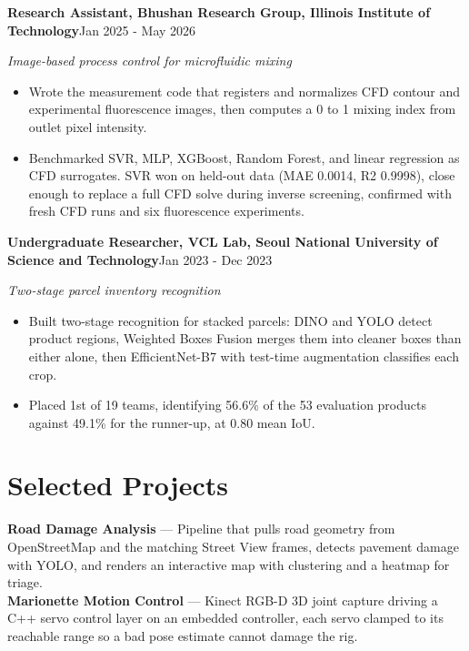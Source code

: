 \documentclass[letterpaper,10pt]{extarticle}
\newcommand{\role}[3]{%
  \textbf{#1}\hfill #3\par
  {\small\itshape #2}\par\vspace{0.5pt}
}
\begin{document}
\role{Research Assistant, Bhushan Research Group, Illinois Institute of Technology}{Image-based process control for microfluidic mixing}{Jan 2025 - May 2026}
\begin{itemize}
  \item Wrote the measurement code that registers and normalizes CFD contour and experimental
        fluorescence images, then computes a 0 to 1 mixing index from outlet pixel intensity.
  \item Benchmarked SVR, MLP, XGBoost, Random Forest, and linear regression as CFD surrogates. SVR
        won on held-out data (MAE 0.0014, R2 0.9998), close enough to replace a full CFD solve during
        inverse screening, confirmed with fresh CFD runs and six fluorescence experiments.
\end{itemize}

\role{Undergraduate Researcher, VCL Lab, Seoul National University of Science and Technology}{Two-stage parcel inventory recognition}{Jan 2023 - Dec 2023}
\begin{itemize}
  \item Built two-stage recognition for stacked parcels: DINO and YOLO detect product regions,
        Weighted Boxes Fusion merges them into cleaner boxes than either alone, then EfficientNet-B7
        with test-time augmentation classifies each crop.
  \item Placed 1st of 19 teams, identifying 56.6\% of the 53 evaluation products against 49.1\% for
        the runner-up, at 0.80 mean IoU.
\end{itemize}

\section{Selected Projects}
\textbf{Road Damage Analysis} --- Pipeline that pulls road geometry from OpenStreetMap and the
matching Street View frames, detects pavement damage with YOLO, and renders an interactive map with
clustering and a heatmap for triage.\\[1pt]
\textbf{Marionette Motion Control} --- Kinect RGB-D 3D joint capture driving a C++ servo control layer
on an embedded controller, each servo clamped to its reachable range so a bad pose estimate cannot
damage the rig.

\end{document}
